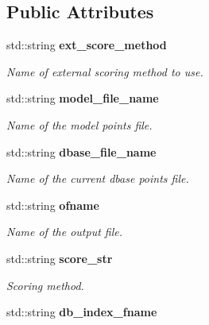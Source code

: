 \subsection*{Public Attributes}
\begin{CompactItemize}
\item 
std::string \bf{ext\_\-score\_\-method}\label{classSimSite3D_1_1SearchParameters_31b913ee478296612756c9b25b34465d}

\begin{CompactList}\small\item\em Name of external scoring method to use. \item\end{CompactList}\item 
std::string \bf{model\_\-file\_\-name}\label{classSimSite3D_1_1SearchParameters_cdcb30f0c043a4137ed8c790502ada62}

\begin{CompactList}\small\item\em Name of the model points file. \item\end{CompactList}\item 
std::string \bf{dbase\_\-file\_\-name}\label{classSimSite3D_1_1SearchParameters_c70448bc467a512efafbf3b952770550}

\begin{CompactList}\small\item\em Name of the current dbase points file. \item\end{CompactList}\item 
std::string \bf{ofname}\label{classSimSite3D_1_1SearchParameters_51c7063e6085b9aa32527a64206ecfdc}

\begin{CompactList}\small\item\em Name of the output file. \item\end{CompactList}\item 
std::string \bf{score\_\-str}\label{classSimSite3D_1_1SearchParameters_770e3c6ff6ae15a21330d15dcfe3d4d5}

\begin{CompactList}\small\item\em Scoring method. \item\end{CompactList}\item 
std::string \bf{db\_\-index\_\-fname}\label{classSimSite3D_1_1SearchParameters_48d9df89d360efd9b57b8917aae33712}


\end{CompactItemize}

